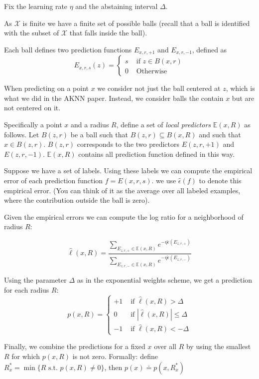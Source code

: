 \documentclass{article}
\def\E{{\mathbb E}}
\def\X{{\mathcal X}}
\begin{document}
Fix the learning rate $\eta$ and the abstaining interval $\Delta$.

As $\X$ is finite we have a finite set of possible
balls (recall that a ball is identified with the subset of $\X$ that
falls inside the ball).

Each ball defines two prediction functions $E_{x,r,+1}$ and
$E_{x,r,-1}$, defined as
\[
  E_{x,r,s}(z) = \begin{cases}
    s & \mbox { if } z \in B(x,r)\\
    0 & \mbox{ Otherwise }
  \end{cases}
\]

When predicting on a point $x$ we consider not just the ball centered
at $z$, which is what we did in the AKNN paper. Instead, we consider
balls the contain $x$ but are not centered on it.

Specifically a point $x$ and a radius $R$, define a set of {\em local predictors} $\E(x,R)$ as
follows. Let $B(z,r)$ be a ball such that $B(z,r) \subseteq B(x,R)$
and such that $x \in B(z,r)$. $B(z,r)$ corresponds to the two predictors
$E(z,r,+1)$ and $E(z,r,-1)$. $\E(x,R)$ contains all prediction
function defined in this way.

\newcommand{\emperr}{\hat{\epsilon}}
\newcommand{\emplog}{\hat{\ell}}

Suppose we have a set of labels. Using these labels we can compute the
empirical error of each prediction function $f=E(x,r,s)$. we use
$\emperr(f)$ to denote this empirical error. (You can think of it as
the average over all labeled examples, where the contribution outside
the ball is zero).

Given the empirical errors we can compute the log ratio for a
neighborhood of radius $R$:

\[
  \emplog(x,R) = \frac
  {\sum_{E_{z,r,+} \in \E(x,R)}e^{-\eta \emperr(E_{z,r,+})}}
  {\sum_{E_{z,r,-} \in \E(x,R)}e^{-\eta \emperr(E_{z,r,-})}}
\]

Using the parameter $\Delta$ as in the exponential weights scheme, we
get a prediction for each radius $R$:
\[
  p(x,R) = \begin{cases}
    +1 & \mbox{ if } \emplog(x,R) > \Delta \\
    0 &  \mbox{ if } |\emplog(x,R)| \leq \Delta \\
    -1 & \mbox{ if } \emplog(x,R) < - \Delta
  \end{cases}
\]

Finally, we combine the predictions for a fixed $x$ over all $R$ by
using the smallest $R$ for which $p(x,R)$ is not zero. Formally:
define $R_x^* = \min\{R \mbox{ s.t. } p(x,R) \neq 0\}$, then $p(x)
\doteq p(x,R_x^*)$
\end{document}

